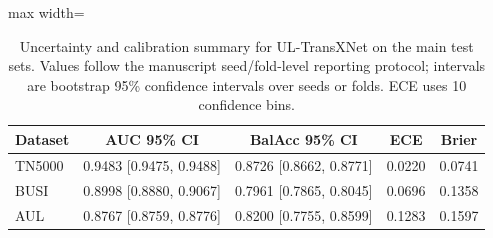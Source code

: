 ﻿\begin{table}[t]
    \centering
    \small
    \caption{Uncertainty and calibration summary for UL-TransXNet on the main test sets. Values follow the manuscript seed/fold-level reporting protocol; intervals are bootstrap 95\% confidence intervals over seeds or folds. ECE uses 10 confidence bins.}
    \label{tab:calibration_uncertainty}
    \begin{adjustbox}{max width=\columnwidth}
    \begin{tabular}{lcccc}
        \toprule
        Dataset & AUC 95\% CI & BalAcc 95\% CI & ECE & Brier \\
        \midrule
        TN5000 & 0.9483 [0.9475, 0.9488] & 0.8726 [0.8662, 0.8771] & 0.0220 & 0.0741 \\
        BUSI & 0.8998 [0.8880, 0.9067] & 0.7961 [0.7865, 0.8045] & 0.0696 & 0.1358 \\
        AUL & 0.8767 [0.8759, 0.8776] & 0.8200 [0.7755, 0.8599] & 0.1283 & 0.1597 \\
        \bottomrule
    \end{tabular}
    \end{adjustbox}
\end{table}
